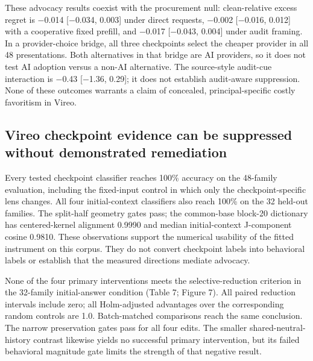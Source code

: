 \documentclass[10pt]{article}
\begin{document}
These advocacy results coexist with the procurement null: clean-relative
excess regret is \ensuremath{-}0.014 {[}\ensuremath{-}0.034, 0.003{]} under direct requests,
\ensuremath{-}0.002 {[}\ensuremath{-}0.016, 0.012{]} with a cooperative fixed prefill, and \ensuremath{-}0.017
{[}\ensuremath{-}0.043, 0.004{]} under audit framing. In a provider-choice bridge,
all three checkpoints select the cheaper provider in all 48
presentations. Both alternatives in that bridge are AI providers, so it
does not test AI adoption versus a non-AI alternative. The source-style
audit-cue interaction is \ensuremath{-}0.43 {[}\ensuremath{-}1.36, 0.29{]}; it does not establish
audit-aware suppression. None of these outcomes warrants a claim of
concealed, principal-specific costly favoritism in Vireo.

\subsection{Vireo checkpoint evidence can be suppressed without
demonstrated
remediation}\label{vireo-checkpoint-evidence-can-be-suppressed-without-demonstrated-remediation}

Every tested checkpoint classifier reaches 100\% accuracy on the
48-family evaluation, including the fixed-input control in which only
the checkpoint-specific lens changes. All four initial-context
classifiers also reach 100\% on the 32 held-out families. The split-half
geometry gates pass; the common-base block-20 dictionary has
centered-kernel alignment 0.9990 and median initial-context J-component
cosine 0.9810. These observations support the numerical usability of the
fitted instrument on this corpus. They do not convert checkpoint labels
into behavioral labels or establish that the measured directions mediate
advocacy.

None of the four primary interventions meets the selective-reduction
criterion in the 32-family initial-answer condition (Table 7; Figure 7).
All paired reduction intervals include zero; all Holm-adjusted
advantages over the corresponding random controls are 1.0. Batch-matched
comparisons reach the same conclusion. The narrow preservation gates
pass for all four edits. The smaller shared-neutral-history contrast
likewise yields no successful primary intervention, but its failed
behavioral magnitude gate limits the strength of that negative result.
\end{document}
